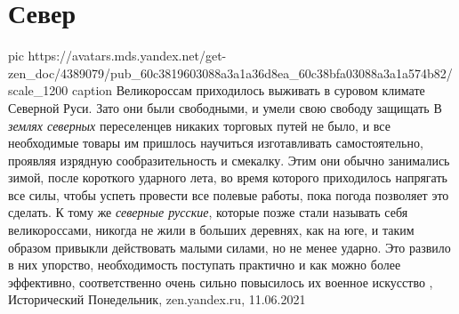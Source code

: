  
 
 
 
 
\chapter{Север}
\label{sec:slova.sever}

\ifcmt
  pic https://avatars.mds.yandex.net/get-zen_doc/4389079/pub_60c3819603088a3a1a36d8ea_60c38bfa03088a3a1a574b82/scale_1200
	caption Великороссам приходилось выживать в суровом климате Северной Руси. Зато они были свободными, и умели свою свободу защищать
\fi
В \emph{землях северных} переселенцев никаких торговых путей не было, и все
необходимые товары им пришлось научиться изготавливать самостоятельно, проявляя
изрядную сообразительность и смекалку. Этим они обычно занимались зимой, после
короткого ударного лета, во время которого приходилось напрягать все силы,
чтобы успеть провести все полевые работы, пока погода позволяет это сделать. К
тому же \emph{северные русские}, которые позже стали называть себя
великороссами, никогда не жили в больших деревнях, как на юге, и таким образом
привыкли действовать малыми силами, но не менее ударно. Это развило в них
упорство, необходимость поступать практично и как можно более эффективно,
соответственно очень сильно повысилось их военное искусство
, 
Исторический Понедельник, zen.yandex.ru, 11.06.2021

